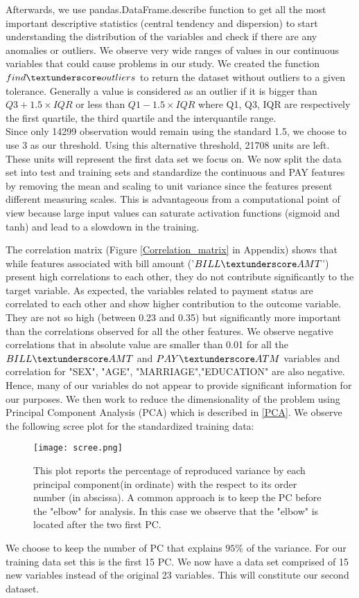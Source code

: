 \documentclass{emulateapj}
\begin{document}
Afterwards, we use pandas.DataFrame.describe function to get all the most important descriptive statistics (central tendency and dispersion) to start understanding the distribution of the variables and check if there are any anomalies or outliers. We observe very wide ranges of values in our continuous variables that could cause problems in our study. We created the function $find\textunderscore outliers$ to return the dataset without outliers to a given tolerance.
Generally a value is considered as an outlier if it is bigger than $Q3+1.5\times IQR$ or less than $Q1-1.5\times IQR$ where Q1, Q3, IQR are respectively the first quartile, the third quartile and the interquantile range.
\\Since only 14299 observation would remain using the standard 1.5, we choose to use 3 as our threshold.
Using this alternative threshold, 21708 units are left.
These units will represent the first data set we focus on. We now split the data set into test and training sets and standardize the continuous and PAY features by removing the mean and scaling to unit variance since the features present different measuring scales. This is advantageous from a computational point of view because large input values can saturate activation functions (sigmoid and tanh) and lead to a slowdown in the training.

The correlation matrix (Figure \ref{Correlation_matrix} in Appendix) shows that while features associated with bill amount ('$BILL\textunderscore AMT$') present high correlations to each other, they do not contribute significantly to the target variable. As expected, the variables related to payment status are correlated to each other and show higher contribution to the outcome variable. They are not so high (between 0.23 and 0.35) but significantly more important than the correlations observed for all the other features. We observe negative correlations that in absolute value are smaller than 0.01 for all the $BILL\textunderscore AMT$ and $PAY \textunderscore ATM$ variables and correlation for "SEX", "AGE", "MARRIAGE","EDUCATION" are also negative. Hence, many of our variables do not appear to provide significant information for our purposes. We then work to reduce the dimensionality of the problem using Principal Component Analysis (PCA) which is described in \ref{PCA}. We observe the following scree plot for the standardized training data:\\
\begin{figure}[H]
    \centering
    \texttt{[image: scree.png]}
    \caption{This plot reports the percentage of reproduced variance by each principal component(in ordinate) with the respect to its order number (in abscissa). A common approach is to keep the PC before the "elbow" for analysis. In this case we observe that the "elbow" is located after the two first PC.}
    \label{fig:scree_plot}
\end{figure}
We choose to keep the number of PC that explains $95\%$ of the variance. For our training data set this is the first 15 PC. We now have a data set comprised of 15 new variables instead of the original 23 variables. This will constitute our second dataset.
\end{document}

